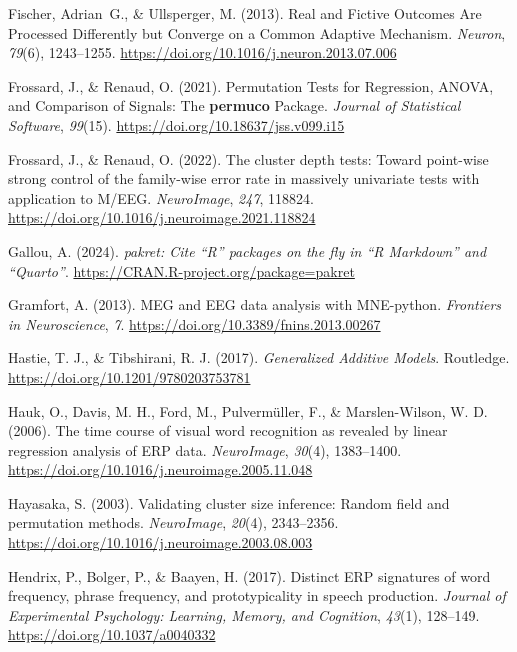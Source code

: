 \documentclass[
  doc,
  floatsintext,
  longtable,
  a4paper,
  nolmodern,
  notxfonts,
  notimes,
  colorlinks=true,linkcolor=blue,citecolor=blue,urlcolor=blue]{apa7}
\newlength{\cslhangindent}
\newenvironment{CSLReferences}[2] %
 {\begin{list}{}{%
  \setlength{\itemindent}{0pt}
  \setlength{\leftmargin}{0pt}
  \setlength{\parsep}{0pt}
  \ifodd #1
   \setlength{\leftmargin}{\cslhangindent}
   \setlength{\itemindent}{-1\cslhangindent}
  \fi
  \setlength{\itemsep}{#2\baselineskip}}}
 {\end{list}}
\begin{document}
\begin{CSLReferences}{1}{0}
Fischer, Adrian~G., \& Ullsperger, M. (2013). Real and Fictive Outcomes
Are Processed Differently but Converge on a Common Adaptive Mechanism.
\emph{Neuron}, \emph{79}(6), 1243--1255.
\url{https://doi.org/10.1016/j.neuron.2013.07.006}

Frossard, J., \& Renaud, O. (2021). Permutation Tests for Regression,
ANOVA, and Comparison of Signals: The {\textbf{permuco}} Package.
\emph{Journal of Statistical Software}, \emph{99}(15).
\url{https://doi.org/10.18637/jss.v099.i15}

Frossard, J., \& Renaud, O. (2022). The cluster depth tests: Toward
point-wise strong control of the family-wise error rate in massively
univariate tests with application to M/EEG. \emph{NeuroImage},
\emph{247}, 118824.
\url{https://doi.org/10.1016/j.neuroimage.2021.118824}

Gallou, A. (2024). \emph{{pakret}: Cite {``{R}''} packages on the fly in
{``{R Markdown}''} and {``{Quarto}''}}.
\url{https://CRAN.R-project.org/package=pakret}

Gramfort, A. (2013). MEG and EEG data analysis with MNE-python.
\emph{Frontiers in Neuroscience}, \emph{7}.
\url{https://doi.org/10.3389/fnins.2013.00267}

Hastie, T. J., \& Tibshirani, R. J. (2017). \emph{Generalized Additive
Models}. Routledge. \url{https://doi.org/10.1201/9780203753781}

Hauk, O., Davis, M. H., Ford, M., Pulvermüller, F., \& Marslen-Wilson,
W. D. (2006). The time course of visual word recognition as revealed by
linear regression analysis of ERP data. \emph{NeuroImage}, \emph{30}(4),
1383--1400. \url{https://doi.org/10.1016/j.neuroimage.2005.11.048}

Hayasaka, S. (2003). Validating cluster size inference: Random field and
permutation methods. \emph{NeuroImage}, \emph{20}(4), 2343--2356.
\url{https://doi.org/10.1016/j.neuroimage.2003.08.003}

Hendrix, P., Bolger, P., \& Baayen, H. (2017). Distinct ERP signatures
of word frequency, phrase frequency, and prototypicality in speech
production. \emph{Journal of Experimental Psychology: Learning, Memory,
and Cognition}, \emph{43}(1), 128--149.
\url{https://doi.org/10.1037/a0040332}


\end{CSLReferences}
\end{document}
